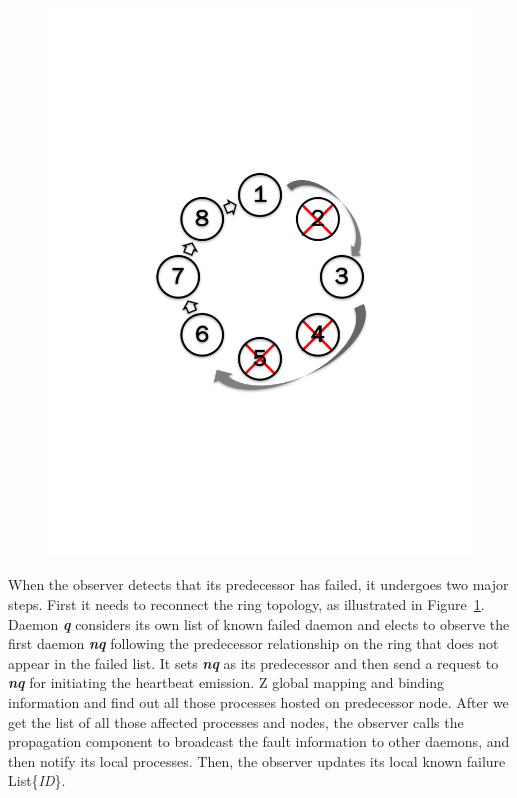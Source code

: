 \documentclass[sigconf]{acmart}
\begin{document}
\begin{figure}[h]
\begin{minipage}[t]{.22\textwidth}
  \includegraphics[trim=3cm 8.0cm 3cm 8cm,width=\linewidth]{reconnet_cross.pdf}
  \label{fig:ReconnectRing}
\end{minipage}
\end{figure}


When the observer detects that its predecessor has failed, it undergoes two major steps.
First it needs to reconnect the ring topology, as illustrated in Figure~\ref{fig:ReconnectRing}. Daemon \textbf{\textit{q}} considers
 its own list of known failed daemon and elects to observe the first 
 daemon \textbf{\textit{nq}} following the predecessor relationship on the ring that does not appear in the failed list. It sets \textbf{\textit{nq}} as its predecessor and then send a request to \textbf{\textit{nq}} for initiating the heartbeat emission. Z global mapping and binding information and find out all those processes hosted on predecessor node. After we get the list of all those affected processes and nodes, the observer calls the propagation component to broadcast the fault information to other daemons, and then notify its local processes. Then, the observer updates its local known failure List\{\textit{ID}\}.
 
\end{document}

